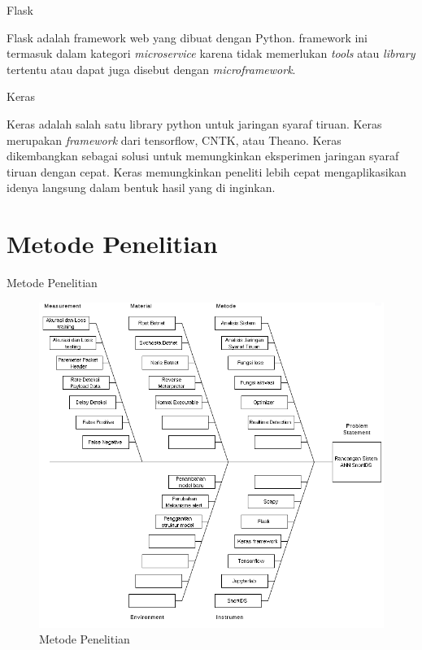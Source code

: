 \documentclass[t]{beamer}
\begin{document}
\begin{frame}{Flask}
	\par Flask adalah framework web yang dibuat dengan Python. framework ini termasuk dalam kategori \textit{microservice} karena tidak memerlukan \textit{tools} atau \textit{library} tertentu atau dapat juga disebut dengan \textit{microframework}.
\end{frame}
\begin{frame}{Keras}
	\par Keras adalah salah satu library python untuk jaringan syaraf tiruan. Keras merupakan \textit{framework} dari tensorflow, CNTK, atau Theano. Keras dikembangkan sebagai solusi untuk memungkinkan eksperimen jaringan syaraf tiruan dengan cepat. Keras memungkinkan peneliti lebih cepat mengaplikasikan idenya langsung dalam bentuk hasil yang di inginkan.
\end{frame}
\section{Metode Penelitian}
\begin{frame}{Metode Penelitian}
	\begin{figure}[H]
		\centering
		\includegraphics{public/assets/img/fishbonepenelitian.png}
		\caption{Metode Penelitian}
		\label{fig:fishbonepenelitian}
	\end{figure}
\end{frame}
\end{document}
